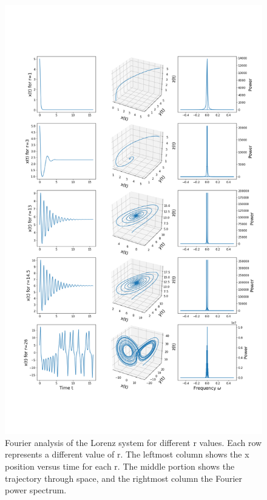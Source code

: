 \documentclass[twocolumn]{article}
\begin{document}
\begin{figure}[p!]
\centering
\includegraphics[trim= 0 +5cm 0 +12cm, width=\linewidth]{15spectra}
\caption{Fourier analysis of the Lorenz system for different r values. Each row represents a different value of r. The leftmost column shows the x position versus time for each r. The middle portion shows the trajectory through space, and the rightmost column the Fourier power spectrum.}
\label{fig:15spectra}
\end{figure}
\end{document}

